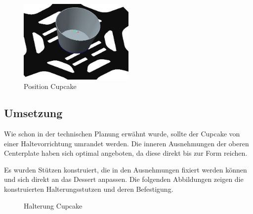 			\begin{figure}[tbh]
			\begin{centering}
			\includegraphics[width = 0.5\textwidth]{Bilder/platte_cupcake}
			\par\end{centering}
			\caption{Position Cupcake}
			\label{platte_cupcake}
			\end{figure}

			\newpage

	\subsection{Umsetzung}

	Wie schon in der technischen Planung erwähnt wurde, sollte der Cupcake von einer Haltevorrichtung umrandet werden.
	Die inneren Ausnehmungen der oberen Centerplate haben sich optimal angeboten, da diese direkt bis zur Form reichen.

	Es wurden Stützen konstruiert, die in den Ausnehmungen fixiert werden können und sich direkt an das Dessert anpassen.
	Die folgenden Abbildungen zeigen die konstruierten Halterungsstutzen und deren Befestigung.

			\begin{figure}[H]
			  \begin{centering}
			  \par\end{centering}
			  \caption{Halterung Cupcake}
			  \label{Halterung_Cupcake}
			\end{figure}

